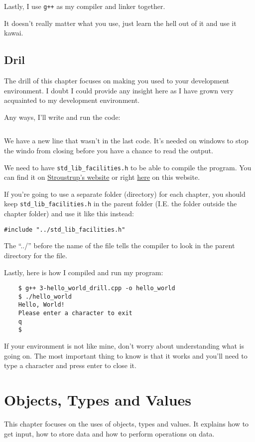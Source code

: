 \documentclass{book}
\begin{document}
Lastly, I use \verb|g++| as my compiler and linker together.

It doesn't really matter what you use, just learn the hell out of it and use it kawai.

\section{Dril}
The drill of this chapter focuses on making you used to your development environment. I doubt I could provide any insight here as I have grown very acquainted to my development environment.

Any ways, I'll write and run the code:

\inputminted{c++}{./csc-201/3-hello_world_drill.cpp}

We have a new line that wasn't in the last code. It's needed on windows to stop the windo from closing before you have a chance to read the output.

We need to have \verb|std_lib_facilities.h| to be able to compile the program. You can find it on \href{https://stroustrup.com/std_lib_facilities.h}{Stroustrup's website} or right \href{./csc-201/std_lib_facilities.h}{here} on this website.

If you're going to use a separate folder (directory) for each chapter, you should keep \verb|std_lib_facilities.h| in the parent folder (I.E. the folder outside the chapter folder) and use it like this instead:

\begin{verbatim}
#include "../std_lib_facilities.h"
\end{verbatim}

The ``../'' before the name of the file tells the compiler to look in the parent directory for the file.

Lastly, here is how I compiled and run my program:

\begin{verbatim}
	$ g++ 3-hello_world_drill.cpp -o hello_world
	$ ./hello_world
	Hello, World!
	Please enter a character to exit
	q
	$
\end{verbatim}

If your environment is not like mine, don't worry about understanding what is going on. The most important thing to know is that it works and you'll need to type a character and press enter to close it.

\chapter{Objects, Types and Values}
This chapter focuses on the uses of objects, types and values. It explains how to get input, how to store data and how to perform operations on data.
\end{document}
